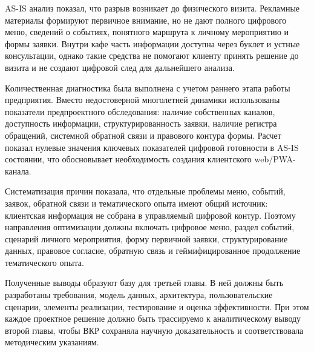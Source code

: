 AS-IS анализ показал, что разрыв возникает до физического визита. Рекламные материалы формируют первичное внимание, но не дают полного цифрового меню, сведений о событиях, понятного маршрута к личному мероприятию и формы заявки. Внутри кафе часть информации доступна через буклет и устные консультации, однако такие средства не помогают клиенту принять решение до визита и не создают цифровой след для дальнейшего анализа.

Количественная диагностика была выполнена с учетом раннего этапа работы предприятия. Вместо недостоверной многолетней динамики использованы показатели предпроектного обследования: наличие собственных каналов, доступность информации, структурированность заявки, наличие регистра обращений, системной обратной связи и правового контура формы. Расчет показал нулевые значения ключевых показателей цифровой готовности в AS-IS состоянии, что обосновывает необходимость создания клиентского web/PWA-канала.

Систематизация причин показала, что отдельные проблемы меню, событий, заявок, обратной связи и тематического опыта имеют общий источник: клиентская информация не собрана в управляемый цифровой контур. Поэтому направления оптимизации должны включать цифровое меню, раздел событий, сценарий личного мероприятия, форму первичной заявки, структурирование данных, правовое согласие, обратную связь и геймифицированное продолжение тематического опыта.

Полученные выводы образуют базу для третьей главы. В ней должны быть разработаны требования, модель данных, архитектура, пользовательские сценарии, элементы реализации, тестирование и оценка эффективности. При этом каждое проектное решение должно быть трассируемо к аналитическому выводу второй главы, чтобы ВКР сохраняла научную доказательность и соответствовала методическим указаниям.
